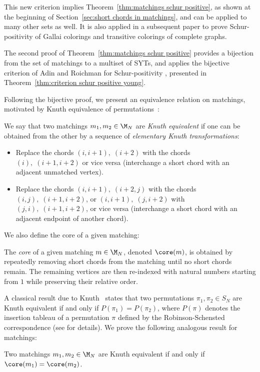 This new criterion implies Theorem~\ref{thm:matchings schur positive}, %
as shown at the beginning of Section~\ref{sec:short chords in matchings}, and can be applied to many other sets as well.
It is also applied in a subsequent paper \cite{gallai} to prove Schur-positivity of Gallai colorings and transitive colorings of complete graphs.

The second proof of Theorem~\ref{thm:matchings schur positive} provides a bijection from the set of matchings to a multiset of SYTs,
and applies the bijective criterion of Adin and Roichman for Schur-positivity \cite[Prop.\ 9.1]{adin_roichman_fine_set}, presented in Theorem~\ref{thm:criterion schur positive young}.

Following the bijective proof, we present an equivalence relation on matchings, motivated by Knuth equivalence of permutations~\cite{knuth1970permutations}:
\begin{definition}\label{def:knuth like equivalence}
    We say that two matchings $m_1,m_2 \in \M_N$ are \emph{Knuth equivalent} if one can be obtained from the other by a sequence of \emph{elementary Knuth transformations}:
    \begin{itemize}
        \item Replace the chords $(i,i+1),\; (i+2)$ with the chords $(i),\; (i+1,i+2)$ or vice versa (\ie interchange a short chord with an adjacent unmatched vertex).
        \item Replace the chords $(i,i+1),\; (i+2,j)$ with the chords $(i,j),\; (i+1,i+2)$, or $(i,i+1),\; (j,i+2)$ with $(j,i),\; (i+1,i+2)$, or vice versa (\ie interchange a short chord with an adjacent endpoint of another chord).
    \end{itemize}
\end{definition}

We also define the core of a given matching:

\begin{definition}
    The \emph{core} of a given matching $m \in \M_N$, denoted $\core(m)$, is obtained by repeatedly removing short chords from the matching until no short chords remain. The remaining vertices are then re-indexed with natural numbers starting from $1$ while preserving their relative order.

\end{definition}

A classical result due to Knuth~\cite{knuth1970permutations} states that two permutations $\pi_1,\pi_2 \in S_N$ are Knuth equivalent if and only if $P(\pi_1) = P(\pi_2)$, where $P(\pi)$ denotes the insertion tableau of a permutation $\pi$ defined by the Robinson-Schensted correspondence (see \cite[Section 3]{sagan_book} for details). We prove the following analogous result for matchings:
\begin{theorem}
    Two matchings $m_1, m_2 \in \M_N$ are Knuth equivalent if and only if $\core(m_1) = \core(m_2)$.
\end{theorem}

